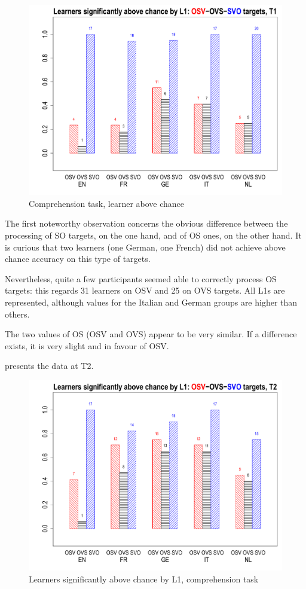 \begin{figure}
    \includegraphics[width=\textwidth]{figures/05-5.pdf}
    \caption{Comprehension task, learner above chance}
    \label{fig:05:5}
\end{figure}

The first noteworthy observation concerns the obvious difference between the processing of SO targets, on the one hand, and of OS ones, on the other hand. It is curious that two learners (one German, one French) did not achieve above chance accuracy on this type of targets. 

Nevertheless, quite a few participants seemed able to correctly process OS targets: this regards 31 learners on OSV and 25 on OVS targets. All L1s are represented, although values for the Italian and German groups are higher than others. 

The two values of OS (OSV and OVS) appear to be very similar. If a difference exists, it is very slight and in favour of OSV. 

 presents the data at T2.

\begin{figure}
    \includegraphics[width=\textwidth]{figures/05-6.pdf}
    \caption{Learners significantly above chance by L1, comprehension task}
    \label{fig:05:6}
\end{figure}

